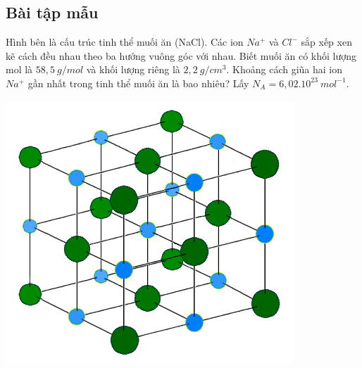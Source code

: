 \subsection{Bài tập mẫu}

\begin{vd}%
	Hình bên là cấu trúc tinh thể muối ăn (NaCl). Các ion $Na^{+}$ và $Cl^{-}$ sắp xếp xen kẽ cách đều nhau theo ba hướng vuông góc với nhau. Biết muối ăn có khối lượng mol là $58,5 \ g/mol$ và khối lượng riêng là $2,2 \ g/cm^{3}$. Khoảng cách giũa hai ion $Na^{+}$ gần nhất trong tinh thể muối ăn là bao nhiêu? Lấy $N_A = 6,02.10^{23} \ mol^{-1}$.
	\begin{center}
		\includegraphics[scale=1.2]{img/Sodium_chloride_crystal.png}
	\end{center}
\end{vd}

